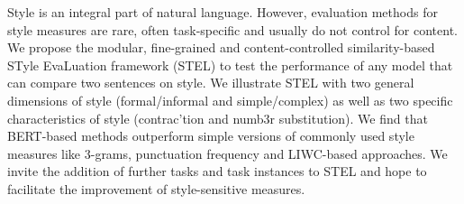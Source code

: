 Style is an integral part of natural language. However, evaluation methods for style measures are rare, often task-specific and usually do not control for content. We propose the modular, fine-grained and content-controlled  similarity-based STyle  EvaLuation framework (STEL) to test the performance of any model that can compare two sentences on style. We illustrate STEL with two general dimensions of style (formal/informal and simple/complex) as well as two specific characteristics of style (contrac'tion and numb3r substitution). We find that BERT-based methods outperform simple versions of commonly used style measures like 3-grams, punctuation frequency and LIWC-based approaches. We invite the addition of further tasks and task instances to STEL and hope to facilitate the improvement of style-sensitive measures.
